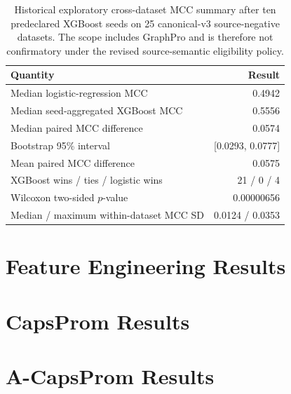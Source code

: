 \begin{table}[htbp]
  \centering
  \caption{Historical exploratory cross-dataset MCC summary after ten predeclared XGBoost seeds on 25 canonical-v3 source-negative datasets. The scope includes GraphPro and is therefore not confirmatory under the revised source-semantic eligibility policy.}
  \label{tab:results-real-negative-ten-seed}
  \begin{tabular}{lr}
    \toprule
    Quantity & Result \\
    \midrule
    Median logistic-regression MCC & 0.4942 \\
    Median seed-aggregated XGBoost MCC & 0.5556 \\
    Median paired MCC difference & 0.0574 \\
    Bootstrap 95\% interval & [0.0293, 0.0777] \\
    Mean paired MCC difference & 0.0575 \\
    XGBoost wins / ties / logistic wins & 21 / 0 / 4 \\
    Wilcoxon two-sided $p$-value & 0.00000656 \\
    Median / maximum within-dataset MCC SD & 0.0124 / 0.0353 \\
    \bottomrule
  \end{tabular}
\end{table}

\section{Feature Engineering Results}\label{sec:results-features}

\pendingresults

\section{CapsProm Results}\label{sec:results-capsprom}

\pendingresults

\section{A-CapsProm Results}\label{sec:results-acapsprom}

\pendingresults
